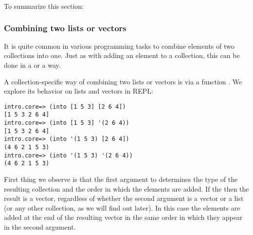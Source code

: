 To summarize this section:

\subsubsection{Combining two lists or vectors}\label{subsubsec:into-concat}
It is quite common in various programming tasks to combine elements of two collections into one. Just as with adding an element to a collection, this can be done in a  or a  way. 

A collection-specific way of combining two lists or vectors is via a function . We explore its behavior on lists and vectors in REPL:
\begin{framed}
\begin{verbatim}
intro.core=> (into [1 5 3] [2 6 4])
[1 5 3 2 6 4]
intro.core=> (into [1 5 3] '(2 6 4))
[1 5 3 2 6 4]
intro.core=> (into '(1 5 3) [2 6 4])
(4 6 2 1 5 3)
intro.core=> (into '(1 5 3) '(2 6 4))
(4 6 2 1 5 3)
\end{verbatim}
\end{framed}
First thing we observe is that the first argument to  determines the type of the resulting collection and the order in which the elements are added. If the  then the result is a vector, regardless of whether the second argument is a vector or a list (or any other collection, as we will find out later). In this case the elements are added at the end of the resulting vector in the same order in which they appear in the second argument. 

